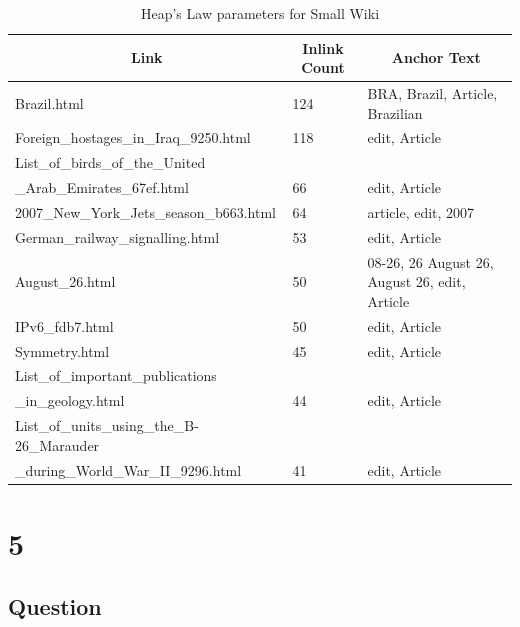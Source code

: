 \documentclass[letterpaper,11pt]{article}
\newcommand*{\srcPath}{../src}%
\begin{document}
\begin{table}
\begin{tabular}{| l | l | l |}
\hline
\multicolumn{1}{|c|}{\textbf{Link}} & \multicolumn{1}{c|}{\textbf{Inlink Count}} & \multicolumn{1}{c|}{\textbf{Anchor Text}}  \\ \hline
Brazil.html &124 & BRA, Brazil, Article, Brazilian \\ \hline
Foreign\_hostages\_in\_Iraq\_9250.html & 118 & edit, Article \\ \hline
List\_of\_birds\_of\_the\_United \\ \_Arab\_Emirates\_67ef.html & 66 & edit, Article \\ \hline
2007\_New\_York\_Jets\_season\_b663.html & 64 & article, edit, 2007 \\ \hline
German\_railway\_signalling.html & 53 & edit, Article \\ \hline
August\_26.html & 50 & 08-26, 26 August 26, August 26, edit, Article \\ \hline
IPv6\_fdb7.html & 50 & edit, Article \\ \hline
Symmetry.html & 45 & edit, Article \\ \hline
List\_of\_important\_publications \\ \_in\_geology.html & 44 & edit, Article \\ \hline
List\_of\_units\_using\_the\_B-26\_Marauder \\ \_during\_World\_War\_II\_9296.html & 41 & edit, Article \\ \hline
\end{tabular}
\caption{Heap's Law parameters for Small Wiki}
\label{table:inlink}
\end{table}



\clearpage


\section*{5}

\subsection*{Question}
\end{document}
